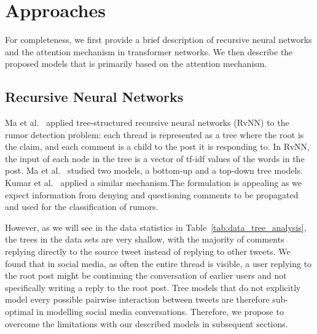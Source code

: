 \documentclass[letterpaper]{article} %
\begin{document}
\section{Approaches} \label{rumor_detection_transformer}

For completeness, we first provide a brief description of recursive neural networks and the attention mechanism in transformer networks. We then describe the proposed models that is primarily based on the attention mechanism.

\subsection{Recursive Neural Networks}
\label{rvnn}

Ma et al.~ applied tree-structured recursive neural networks (RvNN) to the rumor detection problem: each thread is represented as a tree where the root is the claim, and each comment is a child to the post it is responding to.
In RvNN,  the input  of  each  node  in  the  tree is a vector of tf-idf values of the words in the post. Ma et al.~ studied two models, a bottom-up and a top-down tree models. Kumar et al.~ applied a similar mechanism.The formulation is appealing as we expect information from denying and questioning comments to be propagated and used for the classification of rumors.

However, as we will see in the data statistics in Table~\ref{tab:data_tree_analysis}, the trees in the data sets are very shallow, with the majority of comments replying directly to the source tweet instead of replying to other tweets. We found that in social media, as often the entire thread is visible, a user replying to the root post might be continuing the conversation of earlier users and not specifically writing a reply to the root post. Tree models that do not explicitly model every possible pairwise interaction between tweets are therefore sub-optimal in modelling social media conversations. Therefore, we propose to overcome the limitations with our described models in subsequent sections.
\end{document}
